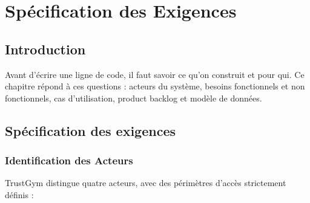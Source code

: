 \documentclass[../main.tex]{subfiles}
\begin{document}
\chapter{Sp\'{e}cification des Exigences}

\section{Introduction}
Avant d'\'{e}crire une ligne de code, il faut savoir ce qu'on construit et pour qui. Ce chapitre r\'{e}pond \`{a} ces questions : acteurs du syst\`{e}me, besoins fonctionnels et non fonctionnels, cas d'utilisation, product backlog et mod\`{e}le de donn\'{e}es.

\section{Sp\'{e}cification des exigences}

\subsection{Identification des Acteurs}
TrustGym distingue quatre acteurs, avec des p\'{e}rim\`{e}tres d'acc\`{e}s strictement d\'{e}finis :
\end{document}
